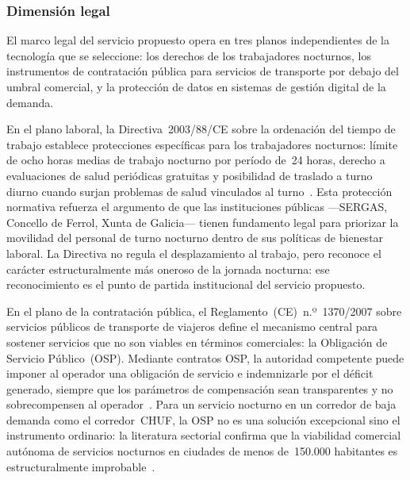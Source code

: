 \subsubsection{Dimensión legal}
\label{sec:pestel-legal}

El marco legal del servicio propuesto opera en tres planos 
independientes de la tecnología que se seleccione: los derechos 
de los trabajadores nocturnos, los instrumentos de contratación 
pública para servicios de transporte por debajo del umbral 
comercial, y la protección de datos en sistemas de gestión 
digital de la demanda.

En el plano laboral, la Directiva~2003/88/CE sobre la ordenación 
del tiempo de trabajo establece protecciones específicas para los 
trabajadores nocturnos: límite de ocho horas medias de trabajo 
nocturno por período de~24 horas, derecho a evaluaciones de salud 
periódicas gratuitas y posibilidad de traslado a turno diurno 
cuando surjan problemas de salud vinculados al 
turno~\parencite{Directiva200388CE}. Esta protección normativa 
refuerza el argumento de que las instituciones públicas 
---SERGAS, Concello de Ferrol, Xunta de Galicia--- tienen 
fundamento legal para priorizar la movilidad del personal de 
turno nocturno dentro de sus políticas de bienestar laboral. 
La Directiva no regula el desplazamiento al trabajo, pero 
reconoce el carácter estructuralmente más oneroso de la 
jornada nocturna: ese reconocimiento es el punto de partida 
institucional del servicio propuesto.

En el plano de la contratación pública, el 
Reglamento~(CE)~n.º~1370/2007 sobre servicios públicos de 
transporte de viajeros define el mecanismo central para 
sostener servicios que no son viables en términos comerciales: 
la Obligación de Servicio Público~(OSP). Mediante contratos OSP, 
la autoridad competente puede imponer al operador una obligación 
de servicio e indemnizarle por el déficit generado, siempre que 
los parámetros de compensación sean transparentes y no 
sobrecompensen al operador~\parencite{Reglamento_CE_1370_2007}. 
Para un servicio nocturno en un corredor de baja demanda como 
el corredor~CHUF, la OSP no es una solución excepcional sino 
el instrumento ordinario: la literatura sectorial confirma que 
la viabilidad comercial autónoma de servicios nocturnos en 
ciudades de menos de~150.000 habitantes es 
estructuralmente improbable~\parencite{UITP2024}.

